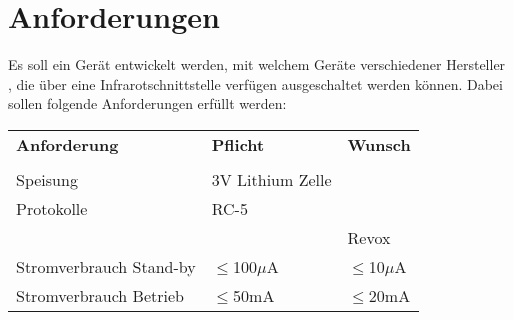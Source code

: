 



\section{Anforderungen}
Es soll ein Gerät entwickelt werden, mit welchem Geräte verschiedener 
Hersteller , die über eine Infrarotschnittstelle verfügen ausgeschaltet 
werden können. Dabei sollen folgende Anforderungen erfüllt werden: 

\begin{table}[h!]
  \begin{tabular}{@{}p{}p{}p{}}
    \rowcolor{white} \textbf{Anforderung}     & \textbf{Pflicht} & \textbf{Wunsch}\\
                                              &                  &                \\
    \rowcolor{white} Speisung                 & 3V Lithium Zelle &                \\
    \rowcolor{lgray} Protokolle               & RC-5             &                \\
    \rowcolor{lgray}                          &                  & Revox          \\
    \rowcolor{white} Stromverbrauch Stand-by  & $\leq$100$\mu$A  & $\leq$10$\mu$A \\
    \rowcolor{lgray} Stromverbrauch Betrieb   & $\leq$50mA       & $\leq$20mA     \\
  \end{tabular}
  \label{tab:anforderungen}
\end{table}
